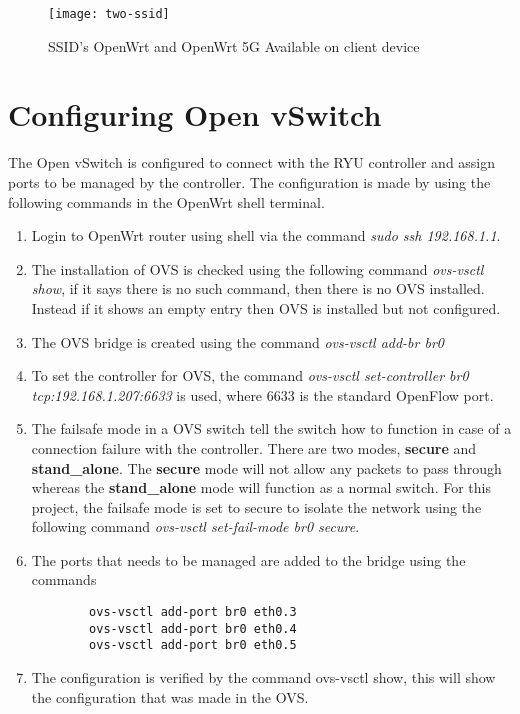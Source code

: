   \begin{figure}[H]
	\centering
	\texttt{[image: two-ssid]}
	\caption {SSID's OpenWrt and OpenWrt 5G Available on client device}
	\label{fig:two-ssid}
	\vspace{-10pt}
\end{figure}
\section{Configuring Open vSwitch}
The Open vSwitch is configured to connect with the RYU controller and assign ports to be managed by the controller. The configuration is made by using the following commands in the OpenWrt shell terminal.
\begin{enumerate}
	\item Login to OpenWrt router using shell via the command \textit{sudo ssh 192.168.1.1}.
	\item The installation of OVS is checked using the following command \textit{ovs-vsctl show}, if it says there is no such command, then there is no OVS installed. Instead if it shows an empty entry then OVS is installed but not configured.
	\item The OVS bridge is created using the command \textit{ovs-vsctl add-br br0}
	\item To set the controller for OVS, the command \textit{ovs-vsctl set-controller br0 tcp:192.168.1.207:6633} is used, where 6633 is the standard OpenFlow port.
	\item The failsafe mode in a OVS switch tell the switch how to function in case of a connection failure with the controller. There are two modes, \textbf{secure} and \textbf{stand\_alone}. The \textbf{secure} mode will not allow any packets to pass through whereas the \textbf{stand\_alone} mode will function as a normal switch. For this project, the failsafe mode is set to secure to isolate the network using the following command \textit{ovs-vsctl set-fail-mode br0 secure}.
	\item The ports that needs to be managed are added to the bridge using the commands
	\begin{lstlisting}
		ovs-vsctl add-port br0 eth0.3
		ovs-vsctl add-port br0 eth0.4
		ovs-vsctl add-port br0 eth0.5
	\end{lstlisting}
	\item The configuration is verified by the command ovs-vsctl show, this will show the configuration that was made in the OVS.
	
\end{enumerate}

